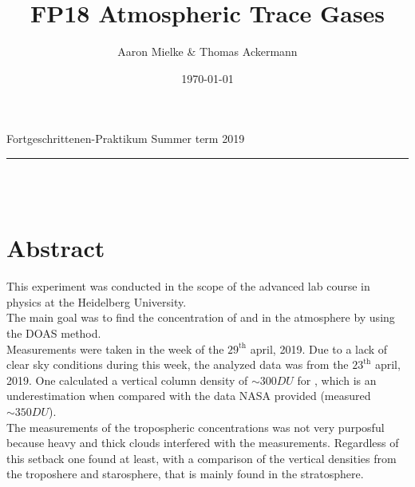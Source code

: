 \documentclass[12pt, a4paper, bibliography=totoc]{scrartcl}
\title{FP18 Atmospheric Trace Gases}
\author{Aaron Mielke \& Thomas Ackermann}
\date{\today}
\begin{document}
\begin{center}
	\makeatletter
	\thispagestyle{empty}
	\large{Fortgeschrittenen-Praktikum}	
	\hfill
    \large{Summer term 2019}
    \vspace{5mm}
	\rule{\textwidth}{0.2pt}
    \vfill
	\Huge\textbf{\@title} \\
	\vspace{10mm}
	\large{\@author} \\
	\normalfont
	\vfill	
	\makeatother
\end{center}

\normalsize
\newpage

\section*{Abstract}

This experiment was conducted in the scope of the advanced lab course in physics at the Heidelberg University. \\
The main goal was to find the concentration of  and  in the atmosphere by using the DOAS method. \\
Measurements were taken in the week of the $29^\text{th}$ april, 2019.
Due to a lack of clear sky conditions during this week, the analyzed data was from the $23^\text{th}$ april, 2019. One calculated a vertical column density of $\sim 300 \si{DU}$ for , which is an underestimation when compared with the data NASA provided (measured $\sim 350 \si{DU}$).\\ 
The measurements of the tropospheric concentrations was not very purposful because heavy and thick clouds interfered with the measurements. Regardless of this setback one found at least, with a comparison of the vertical densities from the troposhere and starosphere, that  is mainly found in the stratosphere. 



\tableofcontents
\newpage
\end{document}
